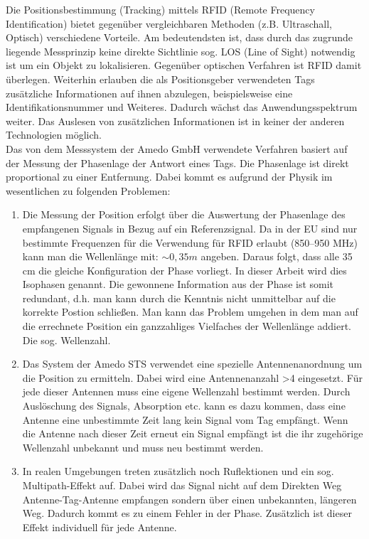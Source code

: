 Die Positionsbestimmung (Tracking) mittels RFID (Remote Frequency Identification) bietet gegenüber vergleichbaren Methoden (z.B. Ultraschall, Optisch) verschiedene Vorteile. Am bedeutendsten ist, dass durch das zugrunde liegende Messprinzip keine direkte Sichtlinie sog. LOS (Line of Sight) notwendig ist um ein Objekt zu lokalisieren. Gegenüber optischen Verfahren ist RFID damit überlegen. Weiterhin erlauben die als Positionsgeber verwendeten Tags zusätzliche Informationen auf ihnen abzulegen, beispielsweise eine Identifikationsnummer und Weiteres. Dadurch wächst das Anwendungsspektrum weiter. Das Auslesen von zusätzlichen Informationen ist in keiner der anderen Technologien möglich.\\

Das von dem Messsystem der {Amedo GmbH} verwendete Verfahren basiert auf der Messung der Phasenlage der Antwort eines Tags. Die Phasenlage ist direkt proportional zu einer Entfernung. Dabei kommt es aufgrund der Physik im wesentlichen zu folgenden Problemen:
\begin{enumerate}
\item Die Messung der Position erfolgt über die Auswertung der Phasenlage des empfangenen Signals in Bezug auf ein Referenzsignal. Da in der EU sind nur bestimmte Frequenzen für die Verwendung für RFID erlaubt (850–950 MHz) kann man die Wellenlänge mit: $ \sim0,35 m $ angeben. Daraus folgt, dass alle 35 cm die gleiche Konfiguration der Phase vorliegt. In dieser Arbeit wird dies Isophasen genannt. Die gewonnene Information aus der Phase ist somit redundant, d.h. man kann durch die Kenntnis nicht unmittelbar auf die korrekte Postion schließen. Man kann das Problem umgehen in dem man auf die errechnete Position ein ganzzahliges Vielfaches der Wellenlänge addiert. Die sog. Wellenzahl.
\item Das System der Amedo STS verwendet eine spezielle Antennenanordnung um die Position zu ermitteln. Dabei wird eine Antennenanzahl >4 eingesetzt. Für jede dieser Antennen muss eine eigene Wellenzahl bestimmt werden. Durch Auslöschung des Signals, Absorption etc. kann es dazu kommen, dass eine Antenne eine unbestimmte Zeit lang kein Signal vom Tag empfängt. Wenn die Antenne nach dieser Zeit erneut ein Signal empfängt ist die ihr zugehörige Wellenzahl unbekannt und muss neu bestimmt werden. 
\item In realen Umgebungen treten zusätzlich noch Ruflektionen und ein sog. Multipath-Effekt auf. Dabei wird das Signal nicht auf dem Direkten Weg Antenne-Tag-Antenne empfangen sondern über einen unbekannten, längeren Weg. Dadurch kommt es zu einem Fehler in der Phase. Zusätzlich ist dieser Effekt individuell für jede Antenne.
\end{enumerate}

